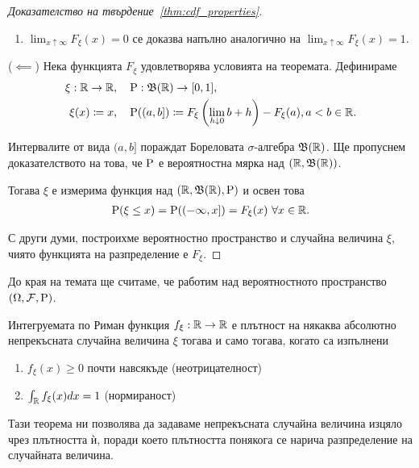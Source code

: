 \documentclass[numbers=endperiod, bibliography=totocnumbered]{scrartcl}
\begin{document}
\begin{proof}[Доказателство на твърдение~\ref{thm:cdf_properties}]
\begin{enumerate}
    \item \( \lim_{x \uparrow \infty} F_\xi(x) = 0 \) се доказва напълно аналогично на \( \lim_{x \uparrow \infty} F_\xi(x) = 1 \).
  \end{enumerate}

  (\( \impliedby \)) Нека функцията \( F_\xi \) удовлетворява условията на теоремата. Дефинираме
  \begin{align*}
    \xi: \mathbb{R} \to \mathbb{R},     &&& \operatorname{P}: \mathfrak{B}(\mathbb{R}) \to [0, 1], \\
    \xi(x) \coloneqq x, &&& \operatorname{P}((a, b]) \coloneqq F_\xi \left(\lim_{h \downarrow 0} b + h \right) - F_\xi(a), a < b \in \mathbb{R}.
  \end{align*}

  Интервалите от вида \( (a, b] \) пораждат Бореловата \( \sigma \)-алгебра \( \mathfrak{B}(\mathbb{R}) \). Ще пропуснем доказателството на това, че \( \operatorname{P} \) е вероятностна мярка над \( (\mathbb{R}, \mathfrak{B}(\mathbb{R})) \).

  Тогава \( \xi \) е измерима функция над \( (\mathbb{R}, \mathfrak{B}(\mathbb{R}), \operatorname{P}) \) и освен това
  \begin{align*}
    \operatorname{P}(\xi \leq x)
    =
    \operatorname{P}((-\infty, x])
    =
    F_\xi(x)~\forall x \in \mathbb{R}.
  \end{align*}

  С други думи, построихме вероятностно пространство и случайна величина \( \xi \), чиято функцията на разпределение е \( F_\xi \).
\end{proof}

До края на темата ще считаме, че работим над вероятностното пространство \( (\Omega, \mathcal{F}, \operatorname{P}) \).

\begin{theorem}\label{thm:density_properties}
  Интегруемата по Риман функция \( f_\xi: \mathbb{R} \to \mathbb{R} \) е плътност на някаква абсолютно непрекъсната случайна величина \( \xi \) тогава и само тогава, когато са изпълнени
  \begin{enumerate}
    \item \( f_\xi(x) \geq 0 \) почти навсякъде (неотрицателност)
    \item \( \int_{\mathbb{R}} f_\xi(x) dx = 1 \) (нормираност)
  \end{enumerate}
\end{theorem}

Тази теорема ни позволява да задаваме непрекъсната случайна величина изцяло чрез плътността ѝ, поради което плътността понякога се нарича разпределение на случайната величина.
\end{document}
